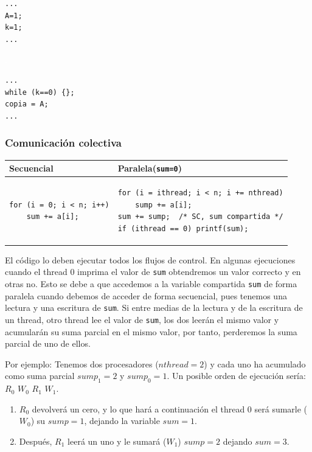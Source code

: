 \documentclass[10pt,a4paper,spanish]{report}
\begin{document}
\begin{center}
\begin{minipage}{0.3\textwidth}
\begin{verbatim}
...
A=1;
k=1;
...
\end{verbatim}
\end{minipage}
\begin{minipage}{0.2\textwidth}
\textcolor{White}{.}
\end{minipage}
\begin{minipage}{0.4\textwidth}
\begin{verbatim}
...
while (k==0) {};
copia = A;
...
\end{verbatim}
\end{minipage}
\end{center}

\textcolor[rgb]{0.2,0.4,0.8}{\subsubsection{Comunicación colectiva}}
\begin{tabular}{|p{7cm}|p{7cm}|}
\hline
Secuencial & Paralela(\verb*|sum=0|) \\
\hline
\begin{verbatim}
for (i = 0; i < n; i++)
    sum += a[i];
\end{verbatim} 
&
\begin{verbatim}
for (i = ithread; i < n; i += nthread)
    sump += a[i];
sum += sump;  /* SC, sum compartida */
if (ithread == 0) printf(sum);
\end{verbatim}
\\
\hline
\end{tabular}

El código lo deben ejecutar todos los flujos de control. En algunas ejecuciones cuando el thread 0 imprima el valor de \verb*|sum| obtendremos un valor correcto y en otras no. Esto se debe a que accedemos a la variable compartida \verb*|sum| de forma paralela cuando debemos de acceder de forma secuencial, pues tenemos una lectura y una escritura de \verb*|sum|. Si entre medias de la lectura y de la escritura de un thread, otro thread lee el valor de \verb*|sum|, los dos leerán el mismo valor y acumularán su suma parcial en el mismo valor, por tanto, perderemos la suma parcial de uno de ellos.

Por ejemplo: Tenemos dos procesadores ($nthread=2$) y cada uno ha acumulado como suma parcial $sump_1 = 2$ y $sump_0 = 1$.
Un posible orden de ejecución sería: $R_0$ $W_0$ $R_1$ $W_1$.
\begin{enumerate}[\color{azul}{\bf $\heartsuit$}]
\label{sump}
    \item $R_0$ devolverá un cero, y lo que hará a continuación el thread $0$ será sumarle ($W_0$) su $sump = 1$, dejando la variable $sum = 1$.
    \item Después, $R_1$ leerá un uno y le sumará ($W_1$) $sump = 2$ dejando $sum = 3$.
\end{enumerate}
\end{document}
